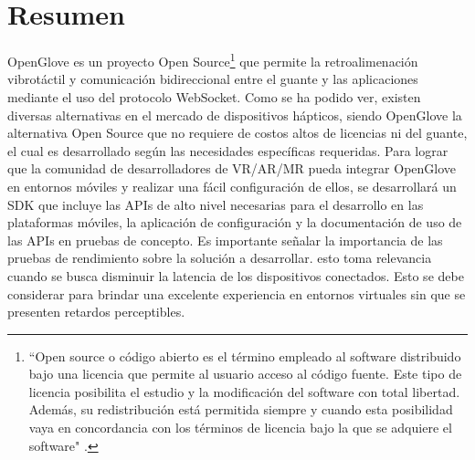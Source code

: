 \section{Resumen}
OpenGlove es un proyecto Open Source\footnote{ ``Open source o código abierto es el término empleado al software distribuido bajo una licencia que permite al usuario acceso al código fuente. Este tipo de licencia posibilita el estudio y la modificación del software con total libertad. Además, su redistribución está permitida siempre y cuando esta posibilidad vaya en concordancia con los términos de licencia bajo la que se adquiere el software" \citep{open-source}.}  que permite la retroalimenación vibrotáctil y comunicación bidireccional entre el guante y las aplicaciones mediante el uso del protocolo WebSocket. Como se ha podido ver, existen diversas alternativas en el mercado de dispositivos hápticos, siendo OpenGlove la alternativa Open Source que no requiere de costos altos de licencias ni del guante,  el cual es desarrollado según las necesidades específicas requeridas. Para lograr que la comunidad de desarrolladores de VR/AR/MR pueda integrar OpenGlove en entornos móviles y realizar una fácil configuración de ellos, se desarrollará un SDK que incluye las APIs de alto nivel necesarias para el desarrollo en las plataformas móviles, la aplicación de configuración y la documentación de uso de las APIs en pruebas de concepto. Es importante señalar la importancia de las pruebas de rendimiento sobre la solución a desarrollar. esto toma relevancia cuando se busca disminuir la latencia de los dispositivos conectados. Esto se debe considerar para brindar una excelente experiencia en entornos virtuales sin que se presenten retardos perceptibles. 

